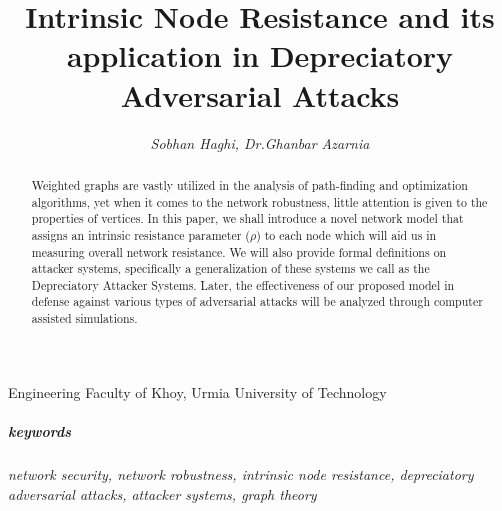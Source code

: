\documentclass{article}
\date{\vspace{-4ex}}
\begin{document}
	\title{\textbf{Intrinsic Node Resistance and its application in Depreciatory Adversarial Attacks}}
	\author{\emph{Sobhan Haghi, Dr.Ghanbar Azarnia}}
	\maketitle
	
	\large{Engineering Faculty of Khoy, Urmia University of Technology}\\
	
	\begin{abstract}
		Weighted graphs are vastly utilized in the analysis of path-finding and optimization algorithms, yet when it comes to the network robustness, little attention is given to the properties of vertices. In this paper, we shall introduce a novel network model that assigns an intrinsic resistance parameter ($\rho$) to each node which will aid us in measuring overall network resistance. We will also provide formal definitions on attacker systems, specifically a generalization of these systems we call as the Depreciatory Attacker Systems. Later, the effectiveness of our proposed model in defense against various types of adversarial attacks will be analyzed through computer assisted simulations.
	\end{abstract}
	
	\subparagraph{keywords}\textit{network security, network robustness, intrinsic node resistance, depreciatory adversarial attacks, attacker systems, graph theory}
	
\end{document}
